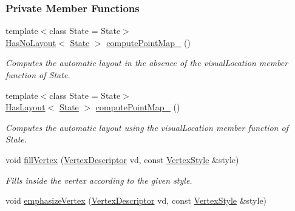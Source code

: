 \subsubsection*{Private Member Functions}
\begin{DoxyCompactItemize}
\item 
{\footnotesize template$<$class State  = State$>$ }\\\hyperlink{group__LayoutTraits_gaf200efa9fbb401dd541fa80e687e0264}{Has\+No\+Layout}$<$ \hyperlink{structslb_1_1core_1_1ui_1_1Drawer_adf9110c216aa1d0a5080547a3bc22f06}{State} $>$ \hyperlink{structslb_1_1core_1_1ui_1_1Drawer_adadbebe7db523e3888c6f740840cf7d2}{compute\+Point\+Map\+\_\+} ()
\begin{DoxyCompactList}\small\item\em Computes the automatic layout in the absence of the {\ttfamily visual\+Location} member function of {\ttfamily State}. \end{DoxyCompactList}\item 
{\footnotesize template$<$class State  = State$>$ }\\\hyperlink{group__LayoutTraits_ga9bf16cc2a70201a2d10994dbffbe094f}{Has\+Layout}$<$ \hyperlink{structslb_1_1core_1_1ui_1_1Drawer_adf9110c216aa1d0a5080547a3bc22f06}{State} $>$ \hyperlink{structslb_1_1core_1_1ui_1_1Drawer_ae26d220bbf7e1c774570ff91dd57d68b}{compute\+Point\+Map\+\_\+} ()
\begin{DoxyCompactList}\small\item\em Computes the automatic layout using the {\ttfamily visual\+Location} member function of {\ttfamily State}. \end{DoxyCompactList}\item 
void \hyperlink{structslb_1_1core_1_1ui_1_1Drawer_ab7b5c9f69f03b5b5f515ab2db5c10d30}{fill\+Vertex} (\hyperlink{structslb_1_1core_1_1ui_1_1Drawer_a3106bd6b1354ea4a24c3ef169c1e18b8}{Vertex\+Descriptor} vd, const \hyperlink{structslb_1_1core_1_1ui_1_1VertexStyle}{Vertex\+Style} \&style)
\begin{DoxyCompactList}\small\item\em Fills inside the vertex according to the given style. \end{DoxyCompactList}\item 
void \hyperlink{structslb_1_1core_1_1ui_1_1Drawer_a897c99eafc0805ec03b876290c39b4c4}{emphasize\+Vertex} (\hyperlink{structslb_1_1core_1_1ui_1_1Drawer_a3106bd6b1354ea4a24c3ef169c1e18b8}{Vertex\+Descriptor} vd, const \hyperlink{structslb_1_1core_1_1ui_1_1VertexStyle}{Vertex\+Style} \&style)

\end{DoxyCompactItemize}

